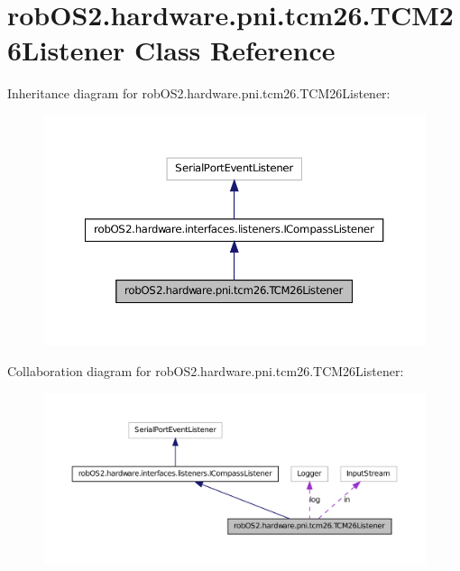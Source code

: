 \hypertarget{classrob_o_s2_1_1hardware_1_1pni_1_1tcm26_1_1_t_c_m26_listener}{
\section{robOS2.hardware.pni.tcm26.TCM26Listener Class Reference}
\label{classrob_o_s2_1_1hardware_1_1pni_1_1tcm26_1_1_t_c_m26_listener}
}


Inheritance diagram for robOS2.hardware.pni.tcm26.TCM26Listener:\nopagebreak
\begin{figure}[H]
\begin{center}
\leavevmode
\includegraphics[width=362pt]{classrob_o_s2_1_1hardware_1_1pni_1_1tcm26_1_1_t_c_m26_listener__inherit__graph}
\end{center}
\end{figure}


Collaboration diagram for robOS2.hardware.pni.tcm26.TCM26Listener:\nopagebreak
\begin{figure}[H]
\begin{center}
\leavevmode
\includegraphics[width=400pt]{classrob_o_s2_1_1hardware_1_1pni_1_1tcm26_1_1_t_c_m26_listener__coll__graph}
\end{center}
\end{figure}
